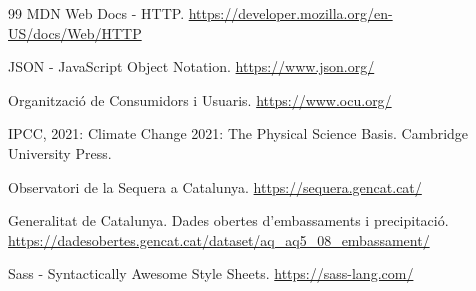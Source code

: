 \begin{thebibliography}{99}
 MDN Web Docs - HTTP. \url{https://developer.mozilla.org/en-US/docs/Web/HTTP}

 JSON - JavaScript Object Notation. \url{https://www.json.org/}

 Organització de Consumidors i Usuaris. \url{https://www.ocu.org/}

 IPCC, 2021: Climate Change 2021: The Physical Science Basis. Cambridge University Press.

 Observatori de la Sequera a Catalunya. \url{https://sequera.gencat.cat/}

 Generalitat de Catalunya. Dades obertes d'embassaments i precipitació. \url{https://dadesobertes.gencat.cat/dataset/aq_aq5_08_embassament/}

 Sass - Syntactically Awesome Style Sheets. \url{https://sass-lang.com/}

\end{thebibliography}
